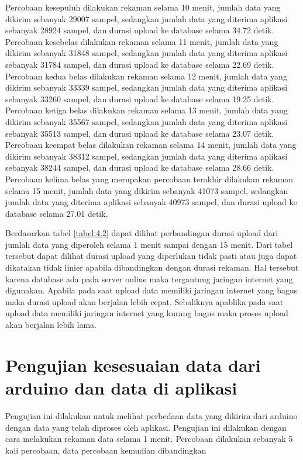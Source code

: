 Percobaan kesepuluh dilakukan rekaman selama 10 menit, jumlah data yang dikirim sebanyak 29007 sampel, sedangkan jumlah data yang diterima aplikasi sebanyak 28924 sampel, dan durasi upload ke database selama 34.72 detik. Percobaan kesebelas dilakukan rekaman selama 11 menit, jumlah data yang dikirim sebanyak 31848 sampel, sedangkan jumlah data yang diterima aplikasi sebanyak 31784 sampel, dan durasi upload ke database selama 22.69 detik. Percobaan kedua belas dilakukan rekaman selama 12 menit, jumlah data yang dikirim sebanyak 33339 sampel, sedangkan jumlah data yang diterima aplikasi sebanyak 33260 sampel, dan durasi upload ke database selama 19.25 detik. Percobaan ketiga belas dilakukan rekaman selama 13 menit, jumlah data yang dikirim sebanyak 35567 sampel, sedangkan jumlah data yang diterima aplikasi sebanyak 35513 sampel, dan durasi upload ke database selama 23.07 detik. Percobaan keempat belas dilakukan rekaman selama 14 menit, jumlah data yang dikirim sebanyak 38312 sampel, sedangkan jumlah data yang diterima aplikasi sebanyak 38244 sampel, dan durasi upload ke database selama 28.66 detik. Percobaan kelima belas yang merupakan percobaan terakhir dilakukan rekaman selama 15 menit, jumlah data yang dikirim sebanyak 41073 sampel, sedangkan jumlah data yang diterima aplikasi sebanyak 40973 sampel, dan durasi upload ke database selama 27.01 detik.

Berdasarkan tabel \ref{tabel:4.2} dapat dilihat perbandingan durasi upload dari jumlah data yang diperoleh selama 1 menit sampai dengan 15 menit. Dari tabel tersebut dapat dilihat durasi upload yang diperlukan tidak pasti atau juga dapat dikatakan tidak linier apabila dibandingkan dengan durasi rekaman. Hal tersebut karena database ada pada server online maka tergantung jaringan internet yang digunakan. Apabila pada saat upload data memiliki jaringan internet yang bagus maka durasi upload akan berjalan lebih cepat. Sebaliknya apablika pada saat upload data memiliki jaringan internet yang kurang bagus maka proses upload akan berjalan lebih lama.

\section{Pengujian kesesuaian data dari arduino dan data di aplikasi}
\vspace{1ex}
Pengujian ini dilakukan untuk melihat perbedaan data yang dikirim dari arduino dengan data yang telah diproses oleh aplikasi. Pengujian ini dilakukan dengan cara melakukan rekaman data selama 1 menit. Percobaan dilakukan sebanyak 5 kali percobaan, data percobaan kemudian dibandingkan 

